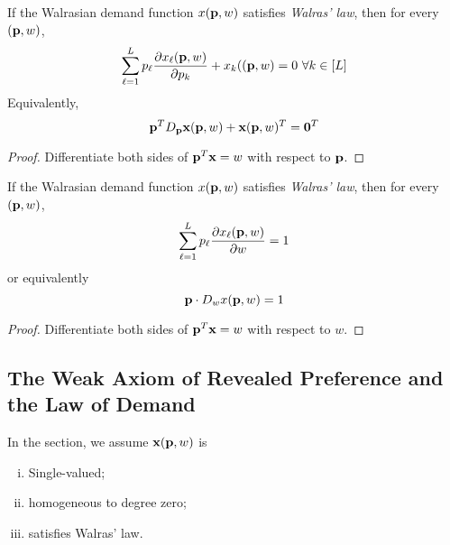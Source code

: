 \documentclass{article}
\begin{document}
 			\begin{proposition}
 				If the Walrasian demand function $x(\textbf{p}, w)$ satisfies \emph{Walras' law}, then for every $(\textbf{p}, w)$,
 				\begin{equation}
 					\sum_{\ell=1}^L p_\ell \frac{\partial{x_\ell(\textbf{p}, w)}}{\partial{p_k}} + x_k((\textbf{p}, w) = 0\ \forall k \in [L]
 				\end{equation}
 				Equivalently,
 				\begin{equation}
 					\textbf{p}^T D_{\textbf{p}} \textbf{x} (\textbf{p}, w) + \textbf{x}(\textbf{p}, w)^T = \textbf{0}^T
 				\end{equation}
 				\begin{proof}
 					Differentiate both sides of $\textbf{p}^T \textbf{x} = w$ with respect to $\textbf{p}$.
 				\end{proof}
 			\end{proposition}
 			
 			\begin{proposition}
 				If the Walrasian demand function $x(\textbf{p}, w)$ satisfies \emph{Walras' law}, then for every $(\textbf{p}, w)$,
 				\begin{equation}
 					\sum_{\ell=1}^L p_\ell \frac{\partial{x_\ell(\textbf{p}, w)}}{\partial{w}} = 1
 				\end{equation}
 				or equivalently
 				\begin{equation}
 					\textbf{p} \cdot D_{w} x(\textbf{p}, w) = 1
 				\end{equation}
 				\begin{proof}
 					Differentiate both sides of $\textbf{p}^T \textbf{x} = w$ with respect to $w$.
 				\end{proof}
 			\end{proposition}
 		
 		\subsection{The Weak Axiom of Revealed Preference and the Law of Demand}
 			\begin{assumption}
 				In the section, we assume $\textbf{x}(\textbf{p}, w)$ is 
 				\begin{enumerate}[(i)]
 					\item Single-valued;
 					\item homogeneous to degree zero;
 					\item satisfies Walras' law.
 				\end{enumerate}
 			\end{assumption}
 			
\end{document}
